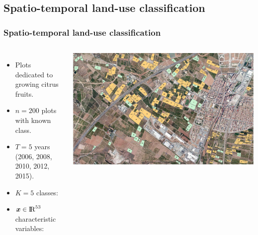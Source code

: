 \documentclass[8pt]{beamer} %
\begin{document}
\subsection*{Spatio-temporal land-use classification}
\begin{frame}[t]\frametitle{Spatio-temporal land-use classification}

\begin{columns}
\begin{itemize}\setlength\itemsep{1mm}
\small
\item[] Plots dedicated to growing citrus fruits.
\item[] $n=200$ plots with known class. 

\item[] $T=5$ years (2006, 2008, 2010, 2012, 2015). \\[5mm]

\item<1->[] $K=5$ classes:\\[2mm]
 \hspace{2mm} 
 
\vspace{5mm}
\item<1->[] $\bm{x}\in {\rm I\!R}^{53}$  characteristic variables:\\[2mm] 
\hspace{2mm} 

\end{itemize}

\includegraphics[scale=0.15, trim = 1mm 0mm 10mm 0mm, clip]{parcelas.pdf}
\end{columns}
\end{frame}
\end{document}
